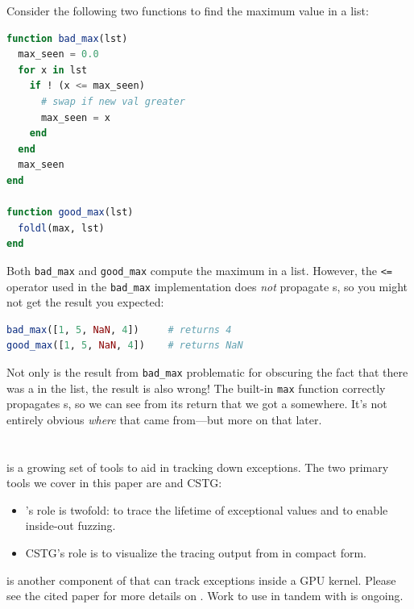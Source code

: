 \documentclass{juliacon}
\begin{document}
Consider the following two functions to find the maximum value in a list:

\begin{lstlisting}[language = Julia]
function bad_max(lst)
  max_seen = 0.0
  for x in lst
    if ! (x <= max_seen)
      # swap if new val greater
      max_seen = x
    end
  end
  max_seen
end

function good_max(lst)
  foldl(max, lst)
end
\end{lstlisting}

Both \texttt{bad\_max} and \texttt{good\_max} compute the maximum in a list.
However, the \texttt{<=} operator used in the \texttt{bad\_max} implementation does \emph{not} propagate \NaN{}s, so you might not get the result you expected:

\begin{lstlisting}[language = Julia]
bad_max([1, 5, NaN, 4])     # returns 4
good_max([1, 5, NaN, 4])    # returns NaN
\end{lstlisting}

Not only is the result from \texttt{bad\_max} problematic for obscuring the fact that there was a \NaN{} in the list, the result is also wrong!
The built-in \texttt{max} function correctly propagates \NaN{}s, so we can see from its return that we got a \NaN{} somewhere.
It's not entirely obvious \emph{where} that \NaN{} came from---but more on that later.   %

\section{\FlowFPX{}}
\label{s:flowfpx}

\FlowFPX{} is a growing set of tools to aid in tracking down \fp{} exceptions.
The two primary tools we cover in this paper are \FT{} and CSTG:

\begin{itemize}
\item \FT{}'s role is twofold: to trace the lifetime of exceptional \fp{} values and to enable inside-out fuzzing.
\item CSTG's role is to visualize the tracing output from \FT{} in compact form.
\end{itemize}

\GPUFPX\cite{llsflg-hpdc-2023} is another component of \FlowFPX{} that can track \fp{} exceptions inside a GPU kernel.
Please see the cited paper for more details on \GPUFPX.
Work to use \GPUFPX in tandem with \FT{} is ongoing.
\end{document}
